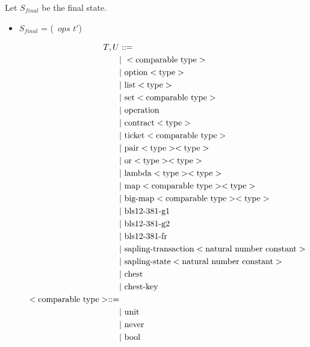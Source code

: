 \documentclass[runningheads]{llncs}
\begin{document}
\noindent Let $S_{final}$  be the final state. 

\begin{itemize}
\item[]  $S_{final}$ = (\PAIR\ $ops$ $t'$) \STACKCONCAT\ \EMPTYSTACK
\end{itemize}





\begin{figure} []
\begin{align*}
T, U &::= \\
   &\Mid\ < \text{comparable type}> \\
   &\Mid\ \text{option} <\text{type}> \\
   &\Mid\ \text{list} <\text{type}> \\
   &\Mid\ \text{set} <\text{comparable type}> \\
   &\Mid\ \text{operation} \\
   &\Mid\ \text{contract} <\text{type}> \\
   &\Mid\ \text{ticket} <\text{comparable type}> \\
   &\Mid\ \text{pair} <\text{type}> <\text{type}> \\
   &\Mid\ \text{or} <\text{type}> <\text{type}> \\
   &\Mid\ \text{lambda} <\text{type}> <\text{type}> \\
   &\Mid\ \text{map} <\text{comparable type}> <\text{type}> \\
   &\Mid\ \text{big-map} <\text{comparable type}> <\text{type}> \\
   &\Mid\ \text{bls12-381-g1} \\
   &\Mid\ \text{bls12-381-g2} \\
   &\Mid\ \text{bls12-381-fr} \\
   &\Mid\ \text{sapling-transaction} <\text{natural number constant}> \\
   &\Mid\ \text{sapling-state} <\text{natural number constant}> \\
   &\Mid\ \text{chest} \\
   &\Mid\ \text{chest-key} \\
<\text{comparable type}> ::= \\
   &\Mid\ \text{unit} \\
   &\Mid\ \text{never} \\
   &\Mid\ \text{bool} \\

\end{align*}
\end{figure}
\end{document}
